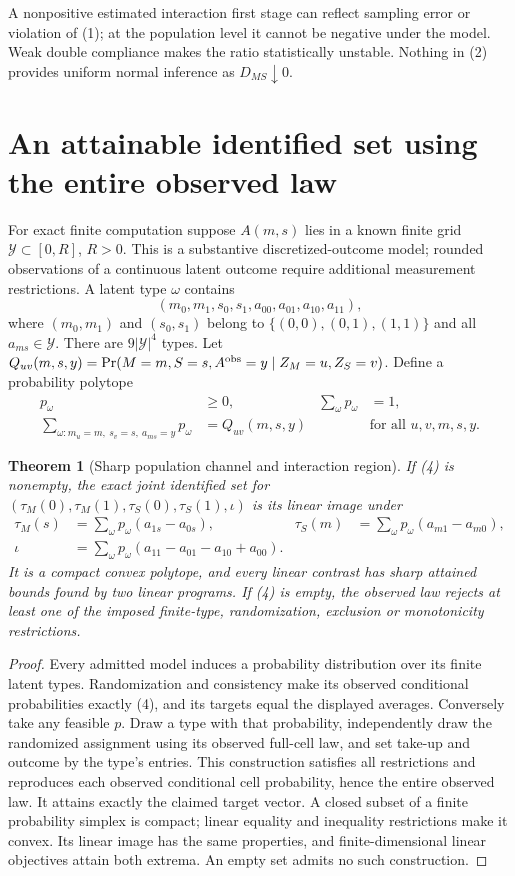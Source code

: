 \documentclass[11pt]{article}
\newtheorem{theorem}{Theorem}
\begin{document}
A nonpositive estimated interaction first stage can reflect sampling
error or violation of (1); at the population level it cannot be negative
under the model. Weak double compliance makes the ratio statistically
unstable. Nothing in (2) provides uniform normal inference as
$D_{MS}\downarrow0$.

\section{An attainable identified set using the entire observed law}
For exact finite computation suppose $A(m,s)$ lies in a known finite grid
$\mathcal Y\subset[0,R]$, $R>0$. This is a substantive discretized-outcome
model; rounded observations of a continuous latent outcome require
additional measurement restrictions. A latent type $\omega$ contains
\[
 (m_0,m_1,s_0,s_1,a_{00},a_{01},a_{10},a_{11}),
\]
where $(m_0,m_1)$ and $(s_0,s_1)$ belong to
$\{(0,0),(0,1),(1,1)\}$ and all $a_{ms}\in\mathcal Y$.
There are $9|\mathcal Y|^4$ types. Let
$Q_{uv}(m,s,y)=\Pr(M=m,S=s,A^{\rm obs}=y\mid Z_M=u,Z_S=v)$.
Define a probability polytope
\begin{align}
 p_\omega&\geq0,&\sum_\omega p_\omega&=1,\nonumber\\
 \sum_{\omega:m_u=m,\ s_v=s,\ a_{ms}=y}p_\omega
       &=Q_{uv}(m,s,y) &&\text{for all }u,v,m,s,y.       \tag{4}
\end{align}

\begin{theorem}[Sharp population channel and interaction region]\label{lp}
If (4) is nonempty, the exact joint identified set for
$(\tau_M(0),\tau_M(1),\tau_S(0),\tau_S(1),\iota)$ is its linear image
under
\begin{align*}
 \tau_M(s)&=\sum_\omega p_\omega(a_{1s}-a_{0s}),&
 \tau_S(m)&=\sum_\omega p_\omega(a_{m1}-a_{m0}),\\
 \iota&=\sum_\omega p_\omega(a_{11}-a_{01}-a_{10}+a_{00}).
\end{align*}
It is a compact convex polytope, and every linear contrast has sharp
attained bounds found by two linear programs. If (4) is empty, the
observed law rejects at least one of the imposed finite-type,
randomization, exclusion or monotonicity restrictions.
\end{theorem}
\begin{proof}
Every admitted model induces a probability distribution over its finite
latent types. Randomization and consistency make its observed conditional
probabilities exactly (4), and its targets equal the displayed averages.
Conversely take any feasible $p$. Draw a type with that probability,
independently draw the randomized assignment using its observed full-cell
law, and set take-up and outcome by the type's entries. This construction
satisfies all restrictions and reproduces each observed conditional cell
probability, hence the entire observed law. It attains exactly the claimed
target vector. A closed subset of a finite probability simplex is compact;
linear equality and inequality restrictions make it convex. Its linear
image has the same properties, and finite-dimensional linear objectives
attain both extrema. An empty set admits no such construction.
\end{proof}
\end{document}
